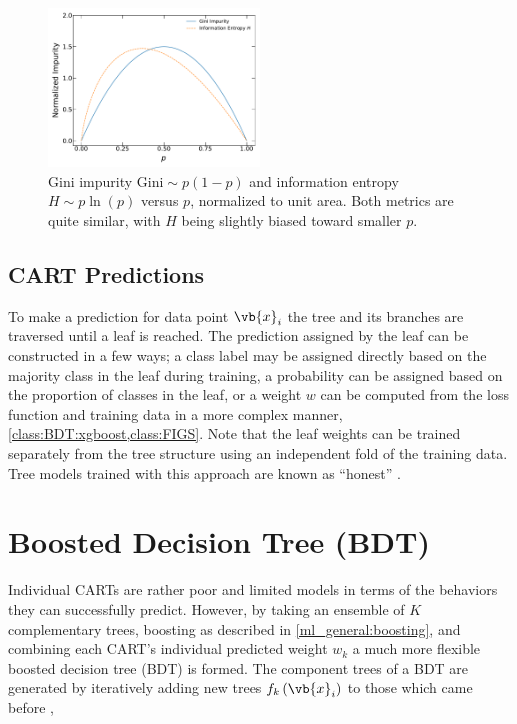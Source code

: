 \begin{figure}[H]
\centering
\includegraphics[width=0.5\textwidth]{figures/ml/gini_vs_info_entropy}
\caption{
Gini impurity $\text{Gini} \sim p\left(1-p\right)$ and
information entropy $H \sim p \ln\left(p\right)$
versus $p$, normalized to unit area.
Both metrics are quite similar,
with $H$ being slightly biased toward smaller $p$.
}
\label{fig:gini_vs_info_entropy}
\end{figure}

\subsection{CART Predictions}
\label{class:CART:pred}

To make a prediction for data point $\vb{x}_{i}$
the tree and its branches are traversed until a leaf is reached.
The prediction assigned by the leaf can be constructed in a few ways;
a class label may be assigned directly based on the majority class in the leaf during training,
a probability can be assigned based on the proportion of classes in the leaf,
or a weight $w$ can be computed from the loss function and training data in a more complex manner,
\eg \cref{class:BDT:xgboost,class:FIGS}.
Note that the leaf weights can be trained separately from the tree structure
using an independent fold of the training data.
Tree models trained with this approach are known as ``honest'' \cite{JMLR:v13:biau12a,pmlr-v32-denil14}.

\section{Boosted Decision Tree (BDT)}
\label{class:BDT}

Individual CARTs are rather poor and limited models
in terms of the behaviors they can successfully predict.
However, by taking an ensemble of $K$ complementary trees,
\ie boosting \cite{10.5555/3091696.3091715,FREUND1997119,Breiman1996BiasV,friedman2000} as described in \cref{ml_general:boosting},
and combining each CART's individual predicted weight $w_{k}$
a much more flexible boosted decision tree (BDT) is formed.
The component trees of a BDT are generated by iteratively adding new trees $f_{k}\left(\vb{x}_{i}\right)$ to those which came before \cite{XGBoost},

